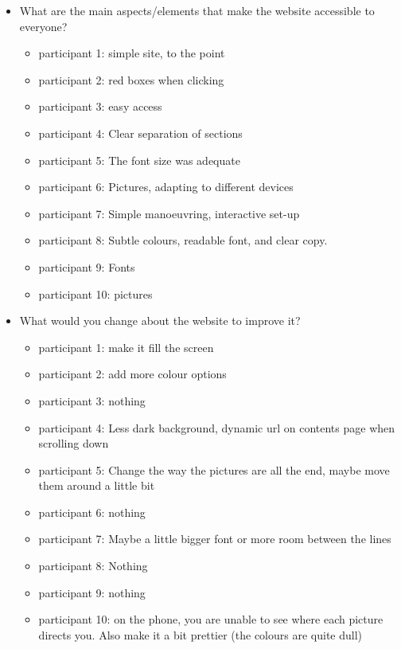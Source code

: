 \documentclass[letterpaper,12pt]{article}
\begin{document}
\begin{appendices}
\begin{itemize}
    \item What are the main aspects/elements that make the website accessible to everyone?
    \begin{itemize}
        \item 	participant 1: 	simple site, to the point
        \item 	participant 2: 	red boxes when clicking
        \item 	participant 3: 	easy access
        \item 	participant 4: 	Clear separation of sections
        \item 	participant 5: 	The font size was adequate 
        \item 	participant 6: 	Pictures, adapting to different devices
        \item 	participant 7: 	Simple manoeuvring, interactive set-up
        \item 	participant 8: 	Subtle colours, readable font, and clear copy.
        \item 	participant 9: 	Fonts
        \item 	participant 10: pictures
    \end{itemize}
\end{itemize}

\begin{itemize}
    \item What would you change about the website to improve it?
    \begin{itemize}
        \item 	participant 1: 	make it fill the screen
        \item 	participant 2: 	add more colour options
        \item 	participant 3: 	nothing
        \item 	participant 4: 	Less dark background, dynamic url on contents page when scrolling down
        \item 	participant 5: 	Change the way the pictures are all the end, maybe move them around a little bit 
        \item 	participant 6: 	nothing
        \item 	participant 7: 	Maybe a little bigger font or more room between the lines
        \item 	participant 8: 	Nothing
        \item 	participant 9: 	nothing
        \item 	participant 10: 	on the phone, you are unable to see where each picture directs you. Also make it a bit prettier (the colours are quite dull)
    \end{itemize}
\end{itemize}


\end{appendices}
\end{document}
